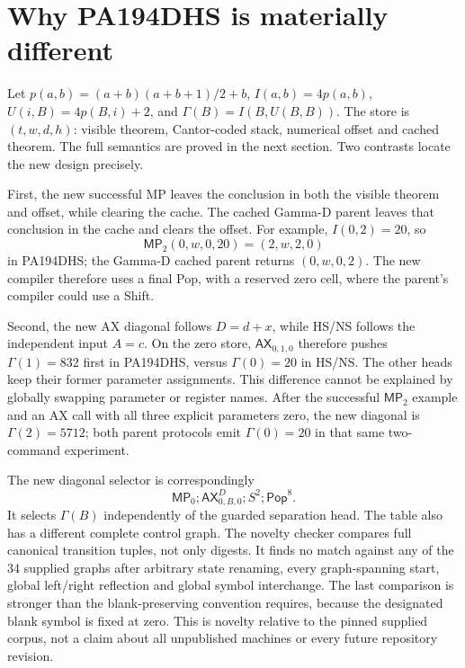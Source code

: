 \documentclass[11pt,letterpaper]{article}
\begin{document}
\section{Why PA194DHS is materially different}
\label{sec:difference}

Let $p(a,b)=(a+b)(a+b+1)/2+b$, $I(a,b)=4p(a,b)$,
$U(i,B)=4p(B,i)+2$, and $\Gamma(B)=I(B,U(B,B))$.
The store is $(t,w,d,h)$: visible theorem, Cantor-coded stack, numerical
offset and cached theorem. The full semantics are proved in the next
section. Two contrasts locate the new design precisely.

First, the new successful MP leaves the conclusion in both the visible
theorem and offset, while clearing the cache. The cached Gamma-D parent
leaves that conclusion in the cache and clears the offset. For example,
$I(0,2)=20$, so
\[
 \mathsf{MP}_{2}(0,w,0,20)=(2,w,2,0)
\]
in PA194DHS; the Gamma-D cached parent returns $(0,w,0,2)$.
The new compiler therefore uses a final Pop, with a reserved zero cell,
where the parent's compiler could use a Shift.

Second, the new AX diagonal follows $D=d+x$, while HS/NS follows the
independent input $A=c$. On the zero store, $\mathsf{AX}_{0,1,0}$ therefore
pushes $\Gamma(1)=832$ first in PA194DHS, versus $\Gamma(0)=20$ in HS/NS.
The other heads keep their former parameter assignments. This difference
cannot be explained by globally swapping parameter or register names.
After the successful $\mathsf{MP}_{2}$ example and an AX call with all three
explicit parameters zero, the new diagonal is $\Gamma(2)=5712$; both parent
protocols emit $\Gamma(0)=20$ in that same two-command experiment.

The new diagonal selector is correspondingly
\[
 \mathsf{MP}_{0};\mathsf{AX}^{D}_{0,B,0};S^2;\mathsf{Pop}^{8}.
\]
It selects $\Gamma(B)$ independently of the guarded separation head.
The table also has a different complete control graph. The novelty checker
compares full canonical transition tuples, not only digests. It finds no
match against any of the 34 supplied graphs after arbitrary state renaming,
every graph-spanning start, global left/right reflection and global symbol
interchange. The last comparison is stronger than the blank-preserving
convention requires, because the designated blank symbol is fixed at zero.
This is novelty relative to the pinned supplied corpus, not a claim about
all unpublished machines or every future repository revision.



\end{document}
